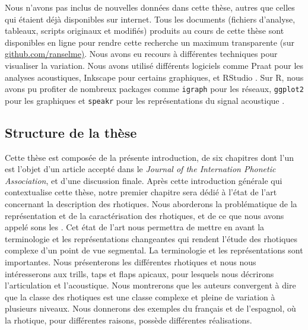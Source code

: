 Nous n'avons pas inclus de nouvelles données dans cette thèse, autres que celles qui étaient déjà disponibles sur internet. Tous les documents (fichiers d'analyse, tableaux, scripts originaux et modifiés) produits au cours de cette thèse sont disponibles en ligne pour rendre cette recherche un maximum transparente (sur \href{https://github.com/ranselme}{github.com/ranselme)}.
Nous avons eu recours à différentes techniques pour visualiser la variation. Nous avons utilisé différents logiciels comme Praat \parencite{boersmaPRAATSystemDoing2001} pour les analyses acoustiques, Inkscape pour certains graphiques, et RStudio \parencite{rcoreteamLanguageEnvironmentStatistical2020}. Sur R, nous avons pu profiter de nombreux packages comme \texttt{igraph} \parencite{csardiIgraphSoftwarePackage2006} pour les réseaux, \texttt{ggplot2} pour les graphiques \parencite{wickhamGgplot2ElegantGraphics2016a} et \texttt{speakr} pour les représentations du signal acoustique \parencite{corettaSpeakrWrapperPhonetic2022}.

\subsection*{Structure de la thèse}

Cette thèse est composée de la présente introduction, de six chapitres dont l'un est l'objet d'un article accepté dans le \textit{Journal of the Internation Phonetic Association}, et d'une discussion finale.
Après cette introduction générale qui contextualise cette thèse, notre premier chapitre sera dédié à l'état de l'art concernant la description des rhotiques. Nous aborderons la problématique de la représentation et de la caractérisation des rhotiques, et de ce que nous avons appelé sons les . Cet état de l'art nous permettra de mettre en avant la terminologie et les représentations changeantes qui rendent l'étude des rhotiques complexe d'un point de vue segmental. La terminologie et les représentations sont importantes. Nous présenterons les différentes rhotiques et nous nous intéresserons aux trills, taps et flaps apicaux, pour lesquels nous décrirons l'articulation et l'acoustique. Nous montrerons que les auteurs convergent à dire que la classe des rhotiques est une classe complexe et pleine de variation à plusieurs niveaux. Nous donnerons des exemples du français et de l'espagnol, où la rhotique, pour différentes raisons, possède différentes réalisations.\\

